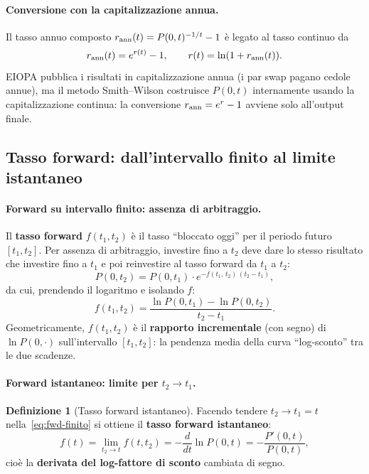 \documentclass[11pt,a4paper]{article}
\theoremstyle{plain}
\theoremstyle{definition}
\newtheorem{definizione}[teorema]{Definizione}
\theoremstyle{remark}
\begin{document}
\paragraph{Conversione con la capitalizzazione annua.}
Il tasso annuo composto $r_{\rm ann}(t) = P(0,t)^{-1/t}-1$ \`e legato al tasso continuo da
\[
  r_{\rm ann}(t) = e^{r(t)} - 1, \qquad r(t) = \ln(1 + r_{\rm ann}(t)).
\]
EIOPA pubblica i risultati in capitalizzazione annua (i par swap pagano cedole annue),
ma il metodo Smith--Wilson costruisce $P(0,t)$ internamente usando la capitalizzazione
continua: la conversione $r_{\rm ann} = e^r - 1$ avviene solo all'output finale.

\subsection{Tasso forward: dall'intervallo finito al limite istantaneo}

\paragraph{Forward su intervallo finito: assenza di arbitraggio.}
Il \textbf{tasso forward} $f(t_1, t_2)$ \`e il tasso ``bloccato oggi'' per il periodo
futuro $[t_1, t_2]$. Per assenza di arbitraggio, investire fino a $t_2$ deve dare lo stesso
risultato che investire fino a $t_1$ e poi reinvestire al tasso forward da $t_1$ a $t_2$:
\[
  P(0, t_2) = P(0, t_1) \cdot e^{-f(t_1,\,t_2)\,(t_2-t_1)},
\]
da cui, prendendo il logaritmo e isolando $f$:
\begin{equation}
  f(t_1, t_2) = \frac{\ln P(0,t_1) - \ln P(0,t_2)}{t_2 - t_1}.
  \label{eq:fwd-finito}
\end{equation}
Geometricamente, $f(t_1,t_2)$ \`e il \textbf{rapporto incrementale} (con segno) di
$\ln P(0,\cdot)$ sull'intervallo $[t_1,t_2]$: la pendenza media della curva
``log-sconto'' tra le due scadenze.

\paragraph{Forward istantaneo: limite per $t_2 \to t_1$.}

\begin{definizione}[Tasso forward istantaneo]
\label{def:forward}
Facendo tendere $t_2 \to t_1 = t$ nella~\eqref{eq:fwd-finito} si ottiene il
\textbf{tasso forward istantaneo}:
\begin{equation}
  f(t) = \lim_{t_2 \to t} f(t, t_2)
       = -\frac{d}{dt}\ln P(0,t)
       = -\frac{P'(0,t)}{P(0,t)},
  \label{eq:fwd-ist}
\end{equation}
cio\`e la \textbf{derivata del log-fattore di sconto} cambiata di segno.
\end{definizione}
\end{document}
